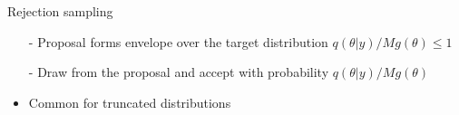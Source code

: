 \documentclass[english,t]{beamer}
\begin{document}
\begin{frame}{Rejection sampling}

    \vspace{-.3\baselineskip}
  \begin{itemize}
  \item[-] Proposal forms envelope over the target distribution ${q(\theta|y)}/{M g(\theta)} \leq 1$
  \item[-] Draw from the proposal and accept with probability ${q(\theta|y)}/{M g(\theta)}$
  \item<3>[-] Common for truncated distributions
  \end{itemize}
  \begin{center}
    \vspace{-1.6\baselineskip}
  \end{center}

\end{frame}
\end{document}
